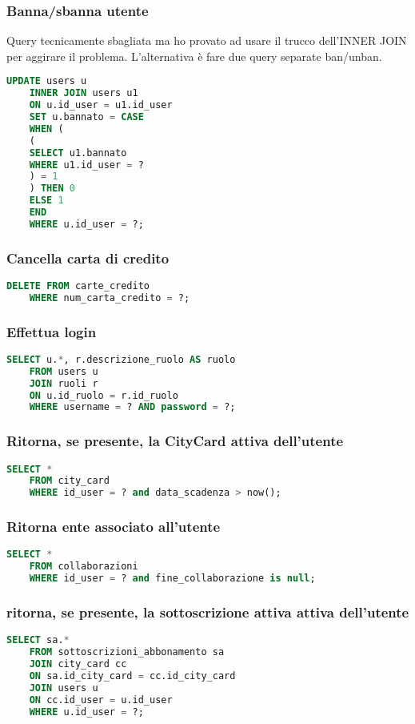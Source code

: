 \subsubsection{Banna/sbanna utente}
Query tecnicamente sbagliata ma ho provato ad usare il trucco dell'INNER JOIN per aggirare il problema. L'alternativa è fare due query separate ban/unban.
\begin{lstlisting}[language=SQL]
	UPDATE users u
	INNER JOIN users u1 
	ON u.id_user = u1.id_user
	SET u.bannato = CASE
	WHEN (
	(
	SELECT u1.bannato
	WHERE u1.id_user = ?
	) = 1
	) THEN 0
	ELSE 1
	END
	WHERE u.id_user = ?;
\end{lstlisting}

\subsubsection{Cancella carta di credito}
\begin{lstlisting}[language=SQL]
	DELETE FROM carte_credito
	WHERE num_carta_credito = ?;
\end{lstlisting}

\subsubsection{Effettua login}
\begin{lstlisting}[language=SQL]
	SELECT u.*, r.descrizione_ruolo AS ruolo
	FROM users u
	JOIN ruoli r 
	ON u.id_ruolo = r.id_ruolo
	WHERE username = ? AND password = ?;
\end{lstlisting}

\subsubsection{Ritorna, se presente, la CityCard attiva dell'utente}
\begin{lstlisting}[language=SQL]
	SELECT *
	FROM city_card
	WHERE id_user = ? and data_scadenza > now();
\end{lstlisting}

\subsubsection{Ritorna ente associato all'utente}
\begin{lstlisting}[language=SQL]
	SELECT *
	FROM collaborazioni
	WHERE id_user = ? and fine_collaborazione is null;
\end{lstlisting}


\subsubsection{ritorna, se presente, la sottoscrizione attiva attiva dell'utente}
\begin{lstlisting}[language=SQL]
	SELECT sa.* 
	FROM sottoscrizioni_abbonamento sa
	JOIN city_card cc
	ON sa.id_city_card = cc.id_city_card
	JOIN users u
	ON cc.id_user = u.id_user
	WHERE u.id_user = ?;
\end{lstlisting}


